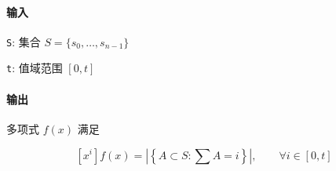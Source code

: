 \paragraph{输入}

\verb|S|: 集合 \(S=\{s_0,\dots,s_{n-1}\}\)

\verb|t|: 值域范围 \([0,t]\)

\paragraph{输出}

多项式 \(f(x)\) 满足

\[
    \left[x^i\right]f(x)=\left|\left\{A\subset S:\sum A=i\right\}\right|,\qquad \forall i\in[0,t]
\]
